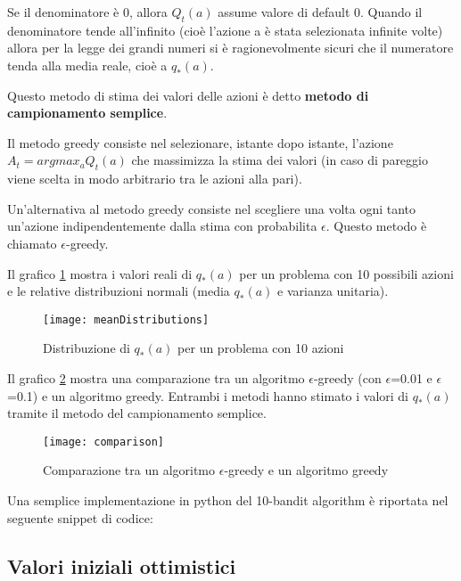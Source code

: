 Se il denominatore è 0, allora $Q_t(a)$ assume valore di default 0.
Quando il denominatore tende all'infinito (cioè l'azione a è stata selezionata
infinite volte) allora per la legge dei grandi numeri si è ragionevolmente sicuri che
il numeratore tenda alla media reale, cioè a $q_*(a)$.

Questo metodo di stima dei valori delle azioni è detto \textbf{metodo di campionamento
semplice}.

Il metodo greedy consiste nel selezionare, istante dopo istante, l'azione
$A_t = argmax_a Q_t(a)$ che massimizza la stima dei valori (in caso di pareggio viene
scelta in modo arbitrario tra le azioni alla pari).

Un'alternativa al metodo greedy consiste nel scegliere una volta ogni tanto un'azione
indipendentemente dalla stima con probabilita $\epsilon$. Questo metodo è chiamato
$\epsilon$-greedy.

Il grafico \ref{fig:meanDistributions} mostra i valori reali di $q_*(a)$ per un
problema con 10 possibili azioni e le relative distribuzioni normali (media $q_*(a)$
e varianza unitaria).

\begin{figure}[H]
\centering
\texttt{[image: meanDistributions]}
\caption{Distribuzione di $q_*(a)$ per un problema con 10 azioni}
\label{fig:meanDistributions}
\end{figure}

Il grafico \ref{fig:comparison} mostra una comparazione tra un algoritmo
$\epsilon$-greedy (con $\epsilon$=0.01 e $\epsilon$=0.1) e un algoritmo greedy.
Entrambi i metodi hanno stimato i valori di $q_*(a)$ tramite il metodo del
campionamento semplice.

\begin{figure}[H]
\centering
\texttt{[image: comparison]}
\caption{Comparazione tra un algoritmo $\epsilon$-greedy e un algoritmo greedy}
\label{fig:comparison}
\end{figure}

Una semplice implementazione in python del 10-bandit algorithm è riportata
nel seguente snippet di codice:



\subsection{Valori iniziali ottimistici}

